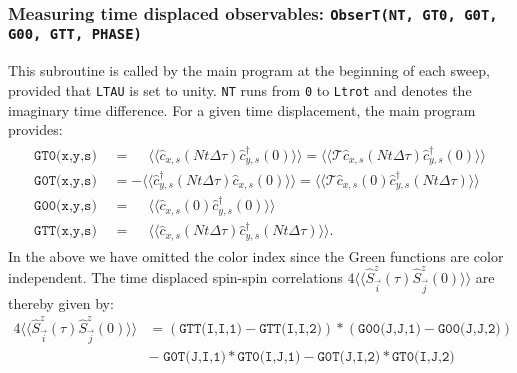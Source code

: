 \subsubsection{Measuring time displaced observables: \texttt{ObserT(NT, GT0, G0T, G00, GTT, PHASE)} }  \label{sec:TimeDispObs}
%
This subroutine is called by the main program at the beginning of each sweep, provided that \texttt{LTAU}  is set to unity.  \texttt{NT} runs from \texttt{0}  to \texttt{Ltrot} and denotes the   imaginary time difference.   For a given time  displacement, the main program provides:
\begin{align}
\begin{aligned}
\texttt{GT0(x,y,s) }  &=   \phantom{+} \langle \langle \hat{c}^{\phantom\dagger}_{x,s} (Nt \Delta \tau)   \hat{c}^{\dagger}_{y,s} (0)   \rangle \rangle = \langle \langle \mathcal{T} \hat{c}^{\phantom\dagger}_{x,s} (Nt \Delta \tau)   \hat{c}^{\dagger}_{y,s} (0)   \rangle \rangle   \\
\texttt{G0T(x,y,s) }   &=  -   \langle \langle   \hat{c}^{\dagger}_{y,s} (Nt \Delta \tau)    \hat{c}^{\phantom\dagger}_{x,s} (0)    \rangle \rangle =
    \langle \langle \mathcal{T} \hat{c}^{\phantom\dagger}_{x,s} (0)    \hat{c}^{\dagger}_{y,s} (Nt \Delta \tau)   \rangle \rangle    \\
  \texttt{G00(x,y,s) }  &=    \phantom{+} \langle \langle \hat{c}^{\phantom\dagger}_{x,s} (0)   \hat{c}^{\dagger}_{y,s} (0)   \rangle \rangle     \\
    \texttt{GTT(x,y,s) }  &=   \phantom{+} \langle \langle \hat{c}^{\phantom\dagger}_{x,s} (Nt \Delta \tau)   \hat{c}^{\dagger}_{y,s} (Nt \Delta \tau)   \rangle \rangle.
\end{aligned}
\end{align}
In the above we have omitted the color index since  the  Green functions are color independent.  The time displaced  spin-spin correlations 
$ 4 \langle \langle \hat{S}^{z}_{\vec{i}} (\tau)  \hat{S}^{z}_{\vec{j}} (0)\rangle \rangle   $ 
are thereby given by: 
\begin{align}
	4 \langle \langle \hat{S}^{z}_{\vec{i}} (\tau)  \hat{S}^{z}_{\vec{j}} (0)\rangle \rangle
	& =  ( \texttt{GTT(I,I,1)} -  \texttt{GTT(I,I,2)} ) * ( \texttt{G00(J,J,1)} -  \texttt{G00(J,J,2)} )      \nonumber \\  
	& -   \; \texttt{G0T(J,I,1)}*\texttt{GT0(I,J,1)}  -  \texttt{G0T(J,I,2)}* \texttt{GT0(I,J,2)}
\end{align}

